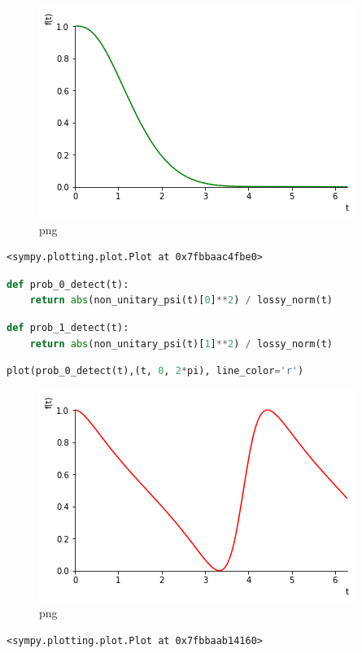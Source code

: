 \begin{figure}
\centering
\includegraphics[width=0.66\linewidth]{output_30_0.png}
\caption[]{png}
\end{figure}

\begin{lstlisting}
<sympy.plotting.plot.Plot at 0x7fbbaac4fbe0>
\end{lstlisting}

\begin{lstlisting}[language=Python]
def prob_0_detect(t):
    return abs(non_unitary_psi(t)[0]**2) / lossy_norm(t)
\end{lstlisting}

\begin{lstlisting}[language=Python]
def prob_1_detect(t):
    return abs(non_unitary_psi(t)[1]**2) / lossy_norm(t)
\end{lstlisting}

\begin{lstlisting}[language=Python]
plot(prob_0_detect(t),(t, 0, 2*pi), line_color='r')
\end{lstlisting}

\begin{figure}
\centering
\includegraphics[width=0.66\linewidth]{output_33_0.png}
\caption[]{png}
\end{figure}

\begin{lstlisting}
<sympy.plotting.plot.Plot at 0x7fbbaab14160>
\end{lstlisting}

